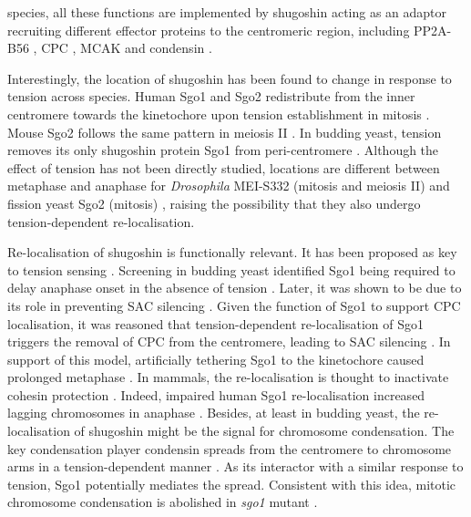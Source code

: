 species, all these functions are implemented by shugoshin acting as an adaptor recruiting different effector proteins to the centromeric region, including PP2A-B56 \citep{Xu2009StructureInteraction, Ueki2021AMitosis}, CPC \citep{Abad2022MechanisticCPC}, MCAK \citep{Tanno2010} and condensin \citep{Verzijlbergen2014, Yahya2020}. 

Interestingly, the location of shugoshin has been found to change in response to tension across species. Human Sgo1 and Sgo2 redistribute from the inner centromere towards the kinetochore upon tension establishment in mitosis \citep{Huang2007, Lee2008, Liu2013, Asai2020}. Mouse Sgo2 follows the same pattern in meiosis II \citep{Lee2008, Gomez2007}. In budding yeast, tension removes its only shugoshin protein Sgo1 from peri-centromere \citep{Eshleman2014, Nerusheva2014, Paldi2020ConvergentPericentromeres}. Although the effect of tension has not been directly studied, locations are different between metaphase and anaphase for \textit{Drosophila} MEI-S332 (mitosis and meiosis II) and fission yeast Sgo2 (mitosis) \citep{Clarke2005, Kawashima2007}, raising the possibility that they also undergo tension-dependent re-localisation. 

Re-localisation of shugoshin is functionally relevant. It has been proposed as key to tension sensing \citep{Marston2015}. Screening in budding yeast identified Sgo1 being required to delay anaphase onset in the absence of tension \citep{Indjeian2005a}. Later, it was shown to be due to its role in preventing SAC silencing \citep{Jin2013TheAttachment}. Given the function of Sgo1 to support CPC localisation, it was reasoned that tension-dependent re-localisation of Sgo1 triggers the removal of CPC from the centromere, leading to SAC silencing \citep{Nerusheva2014}. In support of this model, artificially tethering Sgo1 to the kinetochore caused prolonged metaphase \citep{Su2021SumoylationAnaphase}. In mammals, the re-localisation is thought to inactivate cohesin protection \citep{Lee2008}. Indeed, impaired human Sgo1 re-localisation increased lagging chromosomes in anaphase \citep{Liu2013}. Besides, at least in budding yeast, the re-localisation of shugoshin might be the signal for chromosome condensation. The key condensation player condensin spreads from the centromere to chromosome arms in a tension-dependent manner \citep{Leonard2015}. As its interactor with a similar response to tension, Sgo1 potentially mediates the spread. Consistent with this idea, mitotic chromosome condensation is abolished in \textit{sgo1} mutant \citep{Kruitwagen2018}. 

